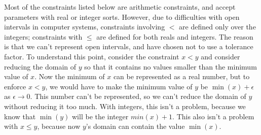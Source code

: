 Most of the constraints listed below are arithmetic constraints, and
accept parameters with real or integer sorts.  However, due to
difficulties with open intervals in computer systems, constraints
involving $<$ are defined only over the integers; constraints with
$\leq$ are defined for both reals and integers.  The reason is that we
can't represent open intervals, and have chosen not to use a tolerance
factor.  To understand this point, consider the constraint $x<y$ and
consider reducing the domain of $y$ so that it contains no values
smaller than the minimum value of $x$.  Now the minimum of $x$ can be
represented as a real number, but to enforce $x<y$, we would have to
make the minimum value of $y$ be $\min(x)+\epsilon$ as $\epsilon
\rightarrow 0$.  This number can't be represented, so we can't reduce
the domain of $y$ without reducing it too much.  With integers, this
isn't a problem, because we know that $\min(y)$ will be the integer
$min(x)+1$.  This also isn't a problem with $x\leq y$, because now
$y$'s domain can contain the value $\min(x)$.

